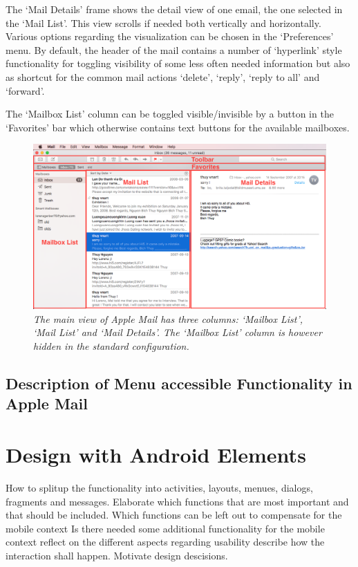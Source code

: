\documentclass[a4paper,11pt,twoside]{article}
\begin{document}
The `Mail Details' frame shows the detail view of one email, the one selected in
the `Mail List'. This view scrolls if needed both vertically and horizontally.
Various options regarding the visualization can be chosen in the `Preferences'
menu. By default, the header of the mail contains a number of `hyperlink' style
functionality for toggling visibility of some less often needed information but
also as shortcut for the common mail actions `delete', `reply', `reply to all' and
`forward'.

The `Mailbox List' column can be toggled visible/invisible
by a button in the `Favorites' bar which otherwise contains text buttons for the
available mailboxes.


\begin{figure}
  \label{fig:apple_main_screen}
  \centering
    \includegraphics[width=1\textwidth]{main_screen}
    \caption{\textit{The main view of Apple Mail has three columns: `Mailbox List',
    `Mail List' and `Mail Details'. The `Mailbox List' column is however
    hidden in the standard configuration.}}
\end{figure}

\subsection{Description of Menu accessible Functionality in Apple Mail}

\section{Design with Android Elements}
How to splitup the functionality into activities, layouts, menues, dialogs, fragments and messages.
Elaborate which functions that are most important and that should be included.
Which functions can be left out to compensate for the mobile context
Is there needed some additional functionality for the mobile context
reflect on the different aspects regarding usability
describe how the interaction shall happen.
Motivate design descisions.
\end{document}
